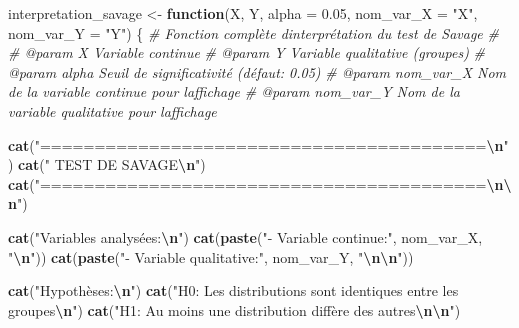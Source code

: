 \documentclass[
  12pt,
]{article}
\newenvironment{Shaded}{\begin{snugshade}}{\end{snugshade}}
\newcommand{\AttributeTok}[1]{\textcolor[rgb]{0.13,0.29,0.53}{#1}}
\newcommand{\CommentTok}[1]{\textcolor[rgb]{0.56,0.35,0.01}{\textit{#1}}}
\newcommand{\ControlFlowTok}[1]{\textcolor[rgb]{0.13,0.29,0.53}{\textbf{#1}}}
\newcommand{\FloatTok}[1]{\textcolor[rgb]{0.00,0.00,0.81}{#1}}
\newcommand{\FunctionTok}[1]{\textcolor[rgb]{0.13,0.29,0.53}{\textbf{#1}}}
\newcommand{\NormalTok}[1]{#1}
\newcommand{\OtherTok}[1]{\textcolor[rgb]{0.56,0.35,0.01}{#1}}
\newcommand{\SpecialCharTok}[1]{\textcolor[rgb]{0.81,0.36,0.00}{\textbf{#1}}}
\newcommand{\StringTok}[1]{\textcolor[rgb]{0.31,0.60,0.02}{#1}}
\begin{document}
\begin{Shaded}
\begin{Highlighting}[]
\NormalTok{interpretation\_savage }\OtherTok{\textless{}{-}} \ControlFlowTok{function}\NormalTok{(X, Y, }\AttributeTok{alpha =} \FloatTok{0.05}\NormalTok{, }\AttributeTok{nom\_var\_X =} \StringTok{"X"}\NormalTok{, }\AttributeTok{nom\_var\_Y =} \StringTok{"Y"}\NormalTok{) \{}
  \CommentTok{\#\textquotesingle{} Fonction complète d\textquotesingle{}interprétation du test de Savage}
  \CommentTok{\#\textquotesingle{} }
  \CommentTok{\#\textquotesingle{} @param X Variable continue}
  \CommentTok{\#\textquotesingle{} @param Y Variable qualitative (groupes)}
  \CommentTok{\#\textquotesingle{} @param alpha Seuil de significativité (défaut: 0.05)}
  \CommentTok{\#\textquotesingle{} @param nom\_var\_X Nom de la variable continue pour l\textquotesingle{}affichage}
  \CommentTok{\#\textquotesingle{} @param nom\_var\_Y Nom de la variable qualitative pour l\textquotesingle{}affichage}
  
  \FunctionTok{cat}\NormalTok{(}\StringTok{"=========================================}\SpecialCharTok{\textbackslash{}n}\StringTok{"}\NormalTok{)}
  \FunctionTok{cat}\NormalTok{(}\StringTok{"           TEST DE SAVAGE}\SpecialCharTok{\textbackslash{}n}\StringTok{"}\NormalTok{)}
  \FunctionTok{cat}\NormalTok{(}\StringTok{"=========================================}\SpecialCharTok{\textbackslash{}n\textbackslash{}n}\StringTok{"}\NormalTok{)}
  
  \FunctionTok{cat}\NormalTok{(}\StringTok{"Variables analysées:}\SpecialCharTok{\textbackslash{}n}\StringTok{"}\NormalTok{)}
  \FunctionTok{cat}\NormalTok{(}\FunctionTok{paste}\NormalTok{(}\StringTok{"{-} Variable continue:"}\NormalTok{, nom\_var\_X, }\StringTok{"}\SpecialCharTok{\textbackslash{}n}\StringTok{"}\NormalTok{))}
  \FunctionTok{cat}\NormalTok{(}\FunctionTok{paste}\NormalTok{(}\StringTok{"{-} Variable qualitative:"}\NormalTok{, nom\_var\_Y, }\StringTok{"}\SpecialCharTok{\textbackslash{}n\textbackslash{}n}\StringTok{"}\NormalTok{))}
  
  \FunctionTok{cat}\NormalTok{(}\StringTok{"Hypothèses:}\SpecialCharTok{\textbackslash{}n}\StringTok{"}\NormalTok{)}
  \FunctionTok{cat}\NormalTok{(}\StringTok{"H0: Les distributions sont identiques entre les groupes}\SpecialCharTok{\textbackslash{}n}\StringTok{"}\NormalTok{)}
  \FunctionTok{cat}\NormalTok{(}\StringTok{"H1: Au moins une distribution diffère des autres}\SpecialCharTok{\textbackslash{}n\textbackslash{}n}\StringTok{"}\NormalTok{)}
  

\end{Highlighting}
\end{Shaded}
\end{document}
